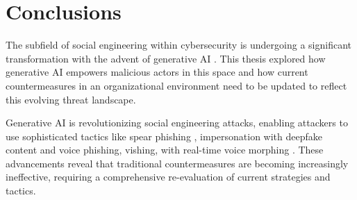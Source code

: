 


\chapter{Conclusions\label{chapter:conclusions}}
\begin{comment}

From course material:
    - "Yhteenveto vaatimattomimmillaan on vain lyhyt kertaus kirjoituksen keskeisistä asioista. Arvokkaamman yhteenvedon saa aikaan kommentoimalla työn tulosten arvoa, työn liittymistä ympäristöön ja tulevaisuudennäkymiä. Tällaiset arviot huolellisesti perusteltava."
    - "Yhteenvetoluku kuvaa teknisten johtopäätösten tuomaa impaktia."

\end{comment}

The subfield of social engineering within cybersecurity is undergoing a significant transformation with the advent of generative AI \citep{fakhouri_AI_Driven_Solutions_SE_Attacks_2024}. This thesis explored how generative AI empowers malicious actors in this space and how current countermeasures in an organizational environment need to be updated to reflect this evolving threat landscape.

Generative AI is revolutionizing social engineering attacks, enabling attackers to use sophisticated tactics like spear phishing \citep{basit_Comprehensive_Survey_AI_Phishing_Detection_2021}, impersonation with deepfake content \citep{mirsky_Creation_Detection_Deepfakes_2021} and voice phishing, vishing, with real-time voice morphing \citep{doan_BTSE_Audio_Deepfake_Detection_2023}. These advancements reveal that traditional countermeasures are becoming increasingly ineffective, requiring a comprehensive re-evaluation of current strategies and tactics.



